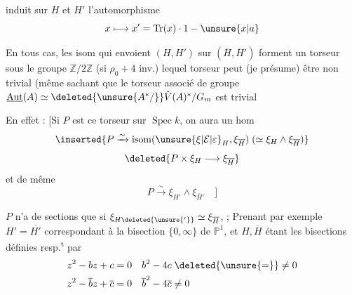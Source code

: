 induit sur $H$ et $H'$ l'automorphisme
\[
x\longmapsto x'=\operatorname{Tr}(x)\cdot1-\unsure{x|a}
\]

En tous cas, les isom qui envoient $(H,H')$ sur $(\overline H,\overline H')$ forment un torseur sous le groupe $\mathbb Z/2\mathbb Z$ (si $\rho_0+4$ inv.) lequel torseur peut (je présume) être non trivial (même sachant que le torseur associé de groupe $\underline{\operatorname{Aut}}(A)\simeq\deleted{\unsure{A^*/}}\check V(A)^*/G_m$ est trivial

 En effet : [Si $P$ est ce torseur sur $\operatorname{Spec} k$, on aura un hom
\[
\inserted{P\xrightarrow{\sim}\operatorname{isom}(\unsure{\xi|\mathcal E|\varepsilon}_H,\xi_{\overline H})\;(\simeq\xi_H\wedge\xi_{\overline H})}
\]
\[
\deleted{P\times\xi_H\longrightarrow\xi_{\overline H}}
\]
  et de même
\[
P\xrightarrow{\sim}\xi_{H'}\wedge\xi_{\overline H'}\quad]
\]

 $P$ n'a de sections que si $\xi_{H\deleted{\unsure{'}}}\simeq\xi_{\overline H}$,  ; Prenant par exemple $H'=\overline{H'}$ correspondant à la bisection $\{0,\infty\}$ de $\mathbb P^1$, et $H,\overline H$ étant les bisections définies resp.\textsuperscript{t} par
\[
\begin{aligned}
z^2-bz+c&=0 & b^2-4c&\mathrel{\deleted{\unsure{=}}\ne}0\\ z^2-\overline b z+\overline c&=0 & \overline b^2-4\overline c&\ne0
\end{aligned}
\]
